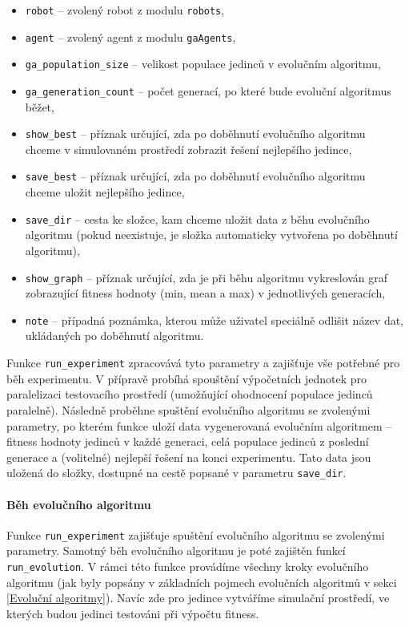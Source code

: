 \begin{itemize}
    \item \texttt{robot} -- zvolený robot z modulu \texttt{robots},
    \item \texttt{agent} -- zvolený agent z modulu \texttt{gaAgents},
    \item \texttt{ga\_population\_size} -- velikost populace jedinců v
        evolučním algoritmu,
    \item \texttt{ga\_generation\_count} -- počet generací, po které bude
        evoluční algoritmus běžet,
    \item \texttt{show\_best} -- příznak určující, zda po doběhnutí evolučního
        algoritmu \\chceme v simulovaném prostředí zobrazit řešení nejlepšího
        jedince,
    \item \texttt{save\_best} -- příznak určující, zda po doběhnutí evolučního
        algoritmu \\chceme uložit nejlepšího jedince,
    \item \texttt{save\_dir} -- cesta ke složce, kam chceme uložit data z běhu
        evolučního algoritmu (pokud neexistuje, je složka automaticky vytvořena
        po doběhnutí algoritmu),
    \item \texttt{show\_graph} -- příznak určující, zda je při běhu algoritmu
        vykreslován graf zobrazující fitness hodnoty (min, mean a max) v
        jednotlivých generacích,
    \item \texttt{note} -- případná poznámka, kterou může uživatel speciálně
        odlišit název dat, ukládaných po doběhnutí algoritmu.
\end{itemize}

Funkce \texttt{run\_experiment} zpracovává tyto parametry a zajišťuje vše
potřebné pro běh experimentu. V přípravě probíhá spouštění výpočetních
jednotek pro paralelizaci testovacího prostředí (umožňující ohodnocení
populace jedinců paralelně). Následně proběhne spuštění evolučního algoritmu se
zvolenými parametry, po kterém funkce uloží data vygenerovaná evolučním
algoritmem -- fitness hodnoty jedinců v každé generaci, celá
populace jedinců z poslední generace a (volitelné) nejlepší řešení na konci
experimentu. Tato data jsou uložená do složky, dostupné na cestě popsané v
parametru \texttt{save\_dir}.

\paragraph{Běh evolučního algoritmu}
Funkce \texttt{run\_experiment} zajišťuje spuštění evolučního algoritmu se
zvolenými parametry. Samotný běh evolučního algoritmu je poté zajištěn funkcí
\texttt{run\_evolution}. V rámci této funkce provádíme všechny kroky evolučního
algoritmu (jak byly popsány v základních pojmech evolučních algoritmů v sekci
\ref{Evoluční algoritmy}). Navíc zde pro jedince vytváříme simulační prostředí,
ve kterých budou jedinci testováni při výpočtu fitness.

